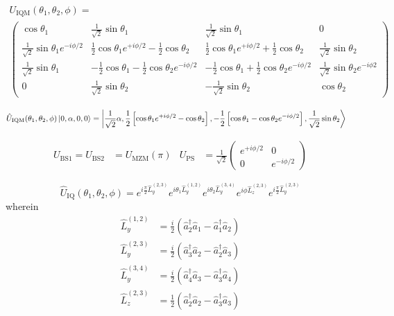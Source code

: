 \begin{equation}
	\begin{split}
		U_\text{IQM}(\theta_1,\theta_2,\phi)
		=
		\\		
		\begin{pmatrix}
			\cos\theta_1 & \frac{1}{\sqrt{2}}\sin\theta_1 & \frac{1}{\sqrt{2}}\sin\theta_1 & 0 \\
			\frac{1}{\sqrt{2}}\sin\theta_1e^{-i\phi/2} & \frac{1}{2}\cos\theta_1e^{+i\phi/2}-\frac{1}{2}\cos\theta_2 & \frac{1}{2}\cos\theta_1e^{+i\phi/2}+\frac{1}{2}\cos\theta_2 & \frac{1}{\sqrt{2}}\sin\theta_2 \\
			\frac{1}{\sqrt{2}}\sin\theta_1 & -\frac{1}{2}\cos\theta_1-\frac{1}{2}\cos\theta_2e^{-i\phi/2} & -\frac{1}{2}\cos\theta_1+\frac{1}{2}\cos\theta_2e^{-i\phi/2} & \frac{1}{\sqrt{2}}\sin\theta_2e^{-i\phi2} \\
			0 & \frac{1}{\sqrt{2}}\sin\theta_2 & -\frac{1}{\sqrt{2}}\sin\theta_2 & \cos\theta_2
		\end{pmatrix}
	\end{split}
\end{equation}

\begin{equation}
	\begin{split}
		\hat{U}_\text{IQM}(\theta_1,\theta_2,\phi)
		\ket{0,\alpha,0,0}
		&=
		\ket{\frac{1}{\sqrt{2}}\alpha,\frac{1}{2}\left[\cos\theta_1e^{+i\phi/2}-\cos\theta_2\right],-\frac{1}{2}\left[\cos\theta_1-\cos\theta_2e^{-i\phi/2}\right],\frac{1}{\sqrt{2}}\sin\theta_2}
	\end{split}
\end{equation}

\begin{align}
	U_\text{BS1}
	=
	U_\text{BS2}
	&=
	U_\text{MZM}(\pi)
	&
	U_\text{PS}
	&=
	\frac{1}{\sqrt{2}}
	\begin{pmatrix}
		e^{+i\phi/2} & 0 \\
		0 & e^{-i\phi/2}
	\end{pmatrix}
\end{align}

\begin{equation}
	\hat{U}_\text{IQ}(\theta_1,\theta_2,\phi)
	=
	e^{i\frac{\pi}{2}\hat{L}_y^{(2,3)}}
	e^{i\theta_1\hat{L}_y^{(1,2)}}
	e^{i\theta_2\hat{L}_y^{(3,4)}}
	e^{i\phi\hat{L}_z^{(2,3)}}
	e^{i\frac{\pi}{2}\hat{L}_y^{(2,3)}}
\end{equation}
wherein~\cite{Leonhardt2010}
\begin{align}
	\hat{L}_y^{(1,2)}
	&=
	\frac{i}{2}
	\left(
		\hat{a}_2^\dagger
		\hat{a}_1
		-
		\hat{a}_1^\dagger
		\hat{a}_2
	\right)
	\\
	\hat{L}_y^{(2,3)}
	&=
	\frac{i}{2}
	\left(
		\hat{a}_3^\dagger
		\hat{a}_2
		-
		\hat{a}_2^\dagger
		\hat{a}_3
	\right)
	\\
	\hat{L}_y^{(3,4)}
	&=
	\frac{i}{2}
	\left(
		\hat{a}_4^\dagger
		\hat{a}_3
		-
		\hat{a}_3^\dagger
		\hat{a}_4
	\right)
	\\
	\hat{L}_z^{(2,3)}
	&=
	\frac{1}{2}
	\left(
		\hat{a}_2^\dagger
		\hat{a}_2
		-
		\hat{a}_3^\dagger
		\hat{a}_3
	\right)
\end{align}

